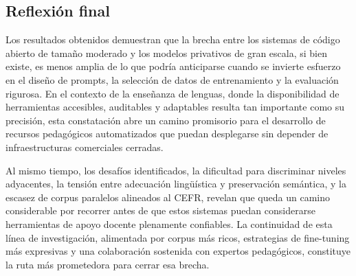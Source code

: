 \subsection*{Reflexión final}

Los resultados obtenidos demuestran que la brecha entre los sistemas de código abierto de tamaño moderado y los modelos privativos de gran escala, si bien existe, es menos amplia de lo que podría anticiparse cuando se invierte esfuerzo en el diseño de prompts, la selección de datos de entrenamiento y la evaluación rigurosa. En el contexto de la enseñanza de lenguas, donde la disponibilidad de herramientas accesibles, auditables y adaptables resulta tan importante como su precisión, esta constatación abre un camino promisorio para el desarrollo de recursos pedagógicos automatizados que puedan desplegarse sin depender de infraestructuras comerciales cerradas.

Al mismo tiempo, los desafíos identificados, la dificultad para discriminar niveles adyacentes, la tensión entre adecuación lingüística y preservación semántica, y la escasez de corpus paralelos alineados al CEFR, revelan que queda un camino considerable por recorrer antes de que estos sistemas puedan considerarse herramientas de apoyo docente plenamente confiables. La continuidad de esta línea de investigación, alimentada por corpus más ricos, estrategias de fine-tuning más expresivas y una colaboración sostenida con expertos pedagógicos, constituye la ruta más prometedora para cerrar esa brecha.